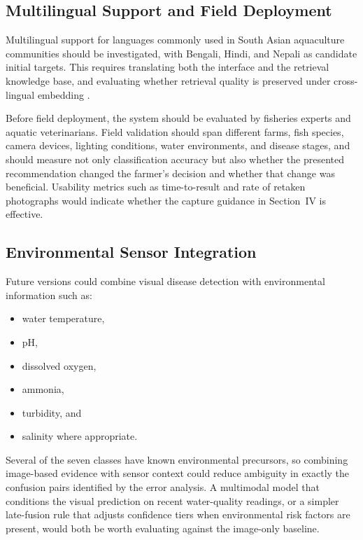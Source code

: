 \documentclass[conference]{IEEEtran}
\begin{document}
\subsection{Multilingual Support and Field Deployment}

Multilingual support for languages commonly used in South Asian aquaculture communities should be investigated, with Bengali, Hindi, and Nepali as candidate initial targets. This requires translating both the interface and the retrieval knowledge base, and evaluating whether retrieval quality is preserved under cross-lingual embedding \cite{b5}.

Before field deployment, the system should be evaluated by fisheries experts and aquatic veterinarians. Field validation should span different farms, fish species, camera devices, lighting conditions, water environments, and disease stages, and should measure not only classification accuracy but also whether the presented recommendation changed the farmer's decision and whether that change was beneficial. Usability metrics such as time-to-result and rate of retaken photographs would indicate whether the capture guidance in Section~IV is effective.

\subsection{Environmental Sensor Integration}

Future versions could combine visual disease detection with environmental information such as:

\begin{itemize}
    \item water temperature,
    \item pH,
    \item dissolved oxygen,
    \item ammonia,
    \item turbidity, and
    \item salinity where appropriate.
\end{itemize}

Several of the seven classes have known environmental precursors, so combining image-based evidence with sensor context could reduce ambiguity in exactly the confusion pairs identified by the error analysis. A multimodal model that conditions the visual prediction on recent water-quality readings, or a simpler late-fusion rule that adjusts confidence tiers when environmental risk factors are present, would both be worth evaluating against the image-only baseline.
\end{document}
